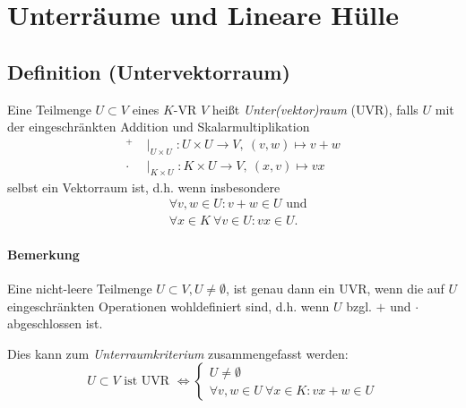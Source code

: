 \section{Unterräume und Lineare Hülle}
\subsection{Definition (Untervektorraum)}
	\begin{Definition}[Untervektorraum]
		Eine Teilmenge $U\subset V$ eines $K$-VR $V$ heißt \emph{Unter(vektor)raum} (UVR), falls $U$ mit der eingeschränkten Addition und Skalarmultiplikation
                \begin{align*}
                        ^+    & \mid_{U\times U}: U\times U \to V,\ (v,w) \mapsto v+w \\
                        \cdot & \mid_{K\times U}: K\times U \to V,\ (x,v) \mapsto vx
                \end{align*}
                selbst ein Vektorraum ist, d.h. wenn insbesondere
                \begin{align*}
                        &\forall v,w \in U: v+w\in U \text{ und}\\
                        &\forall x\in K\ \forall v\in U: vx\in U.
                \end{align*}
	\end{Definition}

\paragraph{Bemerkung}
	Eine nicht-leere Teilmenge $U\subset V, U\neq\emptyset$, ist genau dann ein UVR, wenn die auf $U$ eingeschränkten Operationen wohldefiniert sind, d.h. wenn $ U $ bzgl. $ + $ und $ \cdot $ abgeschlossen ist.

	Dies kann zum \emph{Unterraumkriterium} zusammengefasst werden:
	\begin{equation*}
		U\subset V \text{ ist UVR }\Leftrightarrow 
 		 \begin{cases}
 		 	U\neq\emptyset\\
 		 	\forall v,w\in U\ \forall x\in K: vx+w\in U
 		 \end{cases}
	\end{equation*}

